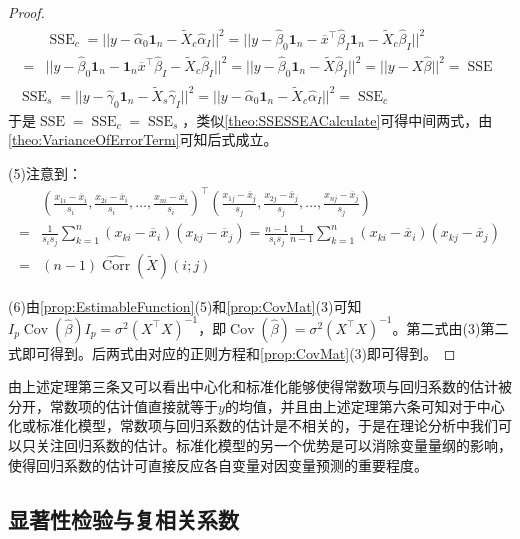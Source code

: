 \begin{proof}
\begin{gather*}
		\begin{aligned}
			&\operatorname{SSE}_c=||y-\hat{\alpha}_0\mathbf{1}_n-\tilde{X}_c\hat{\alpha}_I||^2=||y-\hat{\beta}_0\mathbf{1}_n-\overline{x}^{\top}\hat{\beta}_I\mathbf{1}_n-\tilde{X}_c\hat{\beta}_I||^2 \\
			=&||y-\hat{\beta}_0\mathbf{1}_n-\mathbf{1}_n\overline{x}^{\top}\hat{\beta}_I-\tilde{X}_c\hat{\beta}_I||^2=||y-\hat{\beta}_0\mathbf{1}_n-\tilde{X}\hat{\beta}_I||^2=||y-X\hat{\beta}||^2=\operatorname{SSE}
		\end{aligned} \\
		\operatorname{SSE}_s=||y-\hat{\gamma}_0\mathbf{1}_n-\tilde{X}_s\hat{\gamma}_I||^2=||y-\hat{\alpha}_0\mathbf{1}_n-\tilde{X}_c\hat{\alpha}_I||^2=\operatorname{SSE}_c
	\end{gather*}
	于是$\operatorname{SSE}=\operatorname{SSE}_c=\operatorname{SSE}_s$，类似\cref{theo:SSESSEACalculate}可得中间两式，由\cref{theo:VarianceOfErrorTerm}可知后式成立。\par
	(5)注意到：
	\begin{align*}
		&\left(\frac{x_{1i}-\overline{x}_i}{s_i},\frac{x_{2i}-\overline{x}_i}{s_i},\dots,\frac{x_{ni}-\overline{x}_i}{s_i}\right)^{\top}\left(\frac{x_{1j}-\overline{x}_j}{s_j},\frac{x_{2j}-\overline{x}_j}{s_j},\dots,\frac{x_{nj}-\overline{x}_j}{s_j}\right) \\
		=&\frac{1}{s_is_j}\sum_{k=1}^{n}(x_{ki}-\overline{x}_i)(x_{kj}-\overline{x}_j)=\frac{n-1}{s_is_j}\frac{1}{n-1}\sum_{k=1}^{n}(x_{ki}-\overline{x}_i)(x_{kj}-\overline{x}_j) \\
		=&(n-1)\widehat{\operatorname{Corr}}(\tilde{X})(i;j)
	\end{align*}\par
	(6)由\cref{prop:EstimableFunction}(5)和\cref{prop:CovMat}(3)可知$I_p\operatorname{Cov}(\hat{\beta})I_p=\sigma^2(X^{\top}X)^{-1}$，即$\operatorname{Cov}(\hat{\beta})=\sigma^2(X^{\top}X)^{-1}$。第二式由(3)第二式即可得到。后两式由对应的正则方程和\cref{prop:CovMat}(3)即可得到。
\end{proof}
\begin{note}
	由上述定理第三条又可以看出中心化和标准化能够使得常数项与回归系数的估计被分开，常数项的估计值直接就等于$y$的均值，并且由上述定理第六条可知对于中心化或标准化模型，常数项与回归系数的估计是不相关的，于是在理论分析中我们可以只关注回归系数的估计。标准化模型的另一个优势是可以消除变量量纲的影响，使得回归系数的估计可直接反应各自变量对因变量预测的重要程度。
\end{note}

\subsection{显著性检验与复相关系数}
